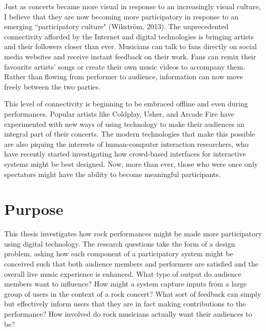 Just as concerts became more visual in response to an increasingly visual culture, I believe that they are now becoming more participatory in response to an emerging ``participatory culture" (Wikstr\"{o}m, 2013). The unprecedented connectivity afforded by the Internet and digital technologies is bringing artists and their followers closer than ever. Musicians can talk to fans directly on social media websites and receive instant feedback on their work. Fans can remix their favourite artists' songs or create their own music videos to accompany them. Rather than flowing from performer to audience, information can now move freely between the two parties.

This level of connectivity is beginning to be embraced offline and even during performances. Popular artists like Coldplay, Usher, and Arcade Fire have experimented with new ways of using technology to make their audiences an integral part of their concerts. The modern technologies that make this possible are also piquing the interests of human-computer interaction researchers, who have recently started investigating how crowd-based interfaces for interactive systems might be best designed. Now, more than ever, those who were once only spectators might have the ability to become meaningful participants.


\section{Purpose}

This thesis investigates how rock performances might be made more participatory using digital technology. The research questions take the form of a design problem, asking how each component of a participatory system might be conceived such that both audience members and performers are satisfied and the overall live music experience is enhanced. What type of output do audience members want to influence? How might a system capture inputs from a large group of users in the context of a rock concert? What sort of feedback can simply but effectively inform users that they are in fact making contributions to the performance? How involved do rock musicians actually want their audiences to be? 

